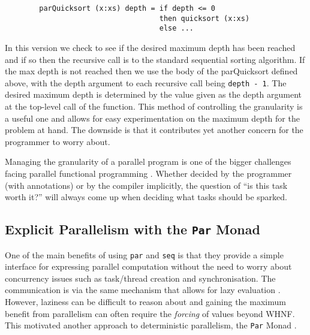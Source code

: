 \begin{verbatim}
        parQuicksort (x:xs) depth = if depth <= 0
                                    then quicksort (x:xs)
                                    else ...
\end{verbatim}

    In this version we check to see if the desired maximum depth has been
reached and if so then the recursive call is to the standard sequential sorting
algorithm. If the max depth is not reached then we use the body of the
parQuicksort defined above, with the depth argument to each recursive call being
\verb=depth - 1=. The desired maximum depth is determined by the value given as
the depth argument at the top-level call of the function. This method of
controlling the granularity is a useful one and allows for easy experimentation
on the maximum depth for the problem at hand. The downside is that it
contributes yet another concern for the programmer to worry about.


Managing the granularity of a parallel program is one of the bigger challenges
facing parallel functional programming \citep{SPJ:PIFPL}. Whether decided by
the programmer (with annotations) or by the compiler implicitly, the question
of ``is this task worth it?'' will always come up when deciding what tasks
should be sparked.


\subsection{Explicit Parallelism with the \texttt{Par} Monad}

One of the main benefits of using \verb|par| and \verb|seq| is that they
provide a simple interface for expressing parallel computation without
the need to worry about concurrency issues such as task/thread creation
and synchronisation. The communication is via the same mechanism that
allows for lazy evaluation \citep{SPF:PIFPL}. However, laziness can
be difficult to reason about and gaining the maximum benefit from parallelism
can often require the \emph{forcing} of values beyond WHNF. 
This motivated another approach to deterministic parallelism, the \verb|Par|
Monad \citep{marlow2011monad}.

